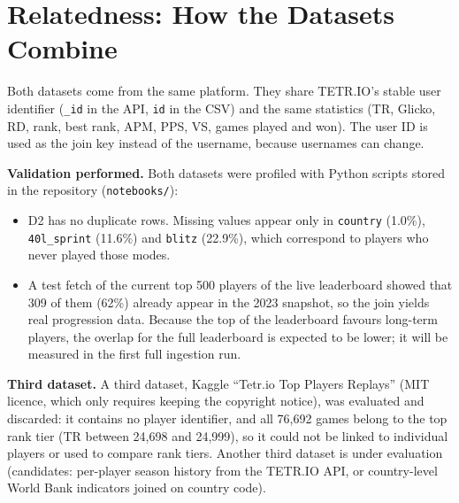 \documentclass[11pt,a4paper]{article}
\begin{document}
\section{Relatedness: How the Datasets Combine}
\begin{center}
\end{center}

\noindent Both datasets come from the same platform. They share TETR.IO's
stable user identifier (\texttt{\_id} in the API, \texttt{id} in the CSV)
and the same statistics (TR, Glicko, RD, rank, best rank, APM, PPS, VS,
games played and won). The user ID is used as the join key instead of the
username, because usernames can change.

\medskip
\noindent\textbf{Validation performed.} Both datasets were profiled with
Python scripts stored in the repository (\texttt{notebooks/}):
\begin{itemize}
  \item D2 has no duplicate rows. Missing values appear only in
        \texttt{country} (1.0\%), \texttt{40l\_sprint} (11.6\%) and
        \texttt{blitz} (22.9\%), which correspond to players who never
        played those modes.
  \item A test fetch of the current top 500 players of the live leaderboard
        showed that 309 of them (62\%) already appear in the 2023 snapshot,
        so the join yields real progression data. Because the top of the
        leaderboard favours long-term players, the overlap for the full
        leaderboard is expected to be lower; it will be measured in the
        first full ingestion run.
\end{itemize}

\noindent\textbf{Third dataset.} A third dataset, Kaggle ``Tetr.io Top
Players Replays'' (MIT licence, which only requires keeping the copyright
notice), was evaluated and discarded: it contains no player
identifier, and all 76{,}692 games belong to the top rank tier (TR between
24{,}698 and 24{,}999), so it could not be linked to individual players or
used to compare rank tiers. Another third dataset is under evaluation
(candidates: per-player season history from the TETR.IO API, or
country-level World Bank indicators joined on country code).
\end{document}
